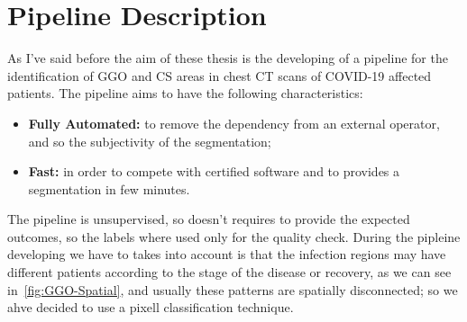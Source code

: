 
	
	\section{Pipeline Description}
	
	As I've said before the aim of these thesis is the developing of a pipeline for the identification of GGO and CS areas in chest CT scans of COVID-19 affected patients. The pipeline aims to have the following characteristics:   
	\begin{itemize}
		\item  \textbf{Fully Automated: } to remove the dependency from an external operator, and so the subjectivity of the segmentation; 
		
		\item \textbf{Fast: } in order to compete with certified software and to provides a segmentation in few minutes.
	\end{itemize}

	The pipeline is unsupervised, so doesn't requires to provide the expected outcomes, so the labels where used only for the quality check. During the pipleine developing we have to takes into account is that the infection regions may have different patients according to the stage of the disease or recovery, as we can see in \figurename\,\ref{fig:GGO-Spatial}, and usually these patterns are spatially disconnected; so we ahve decided to use a pixell classification technique.
	
	
